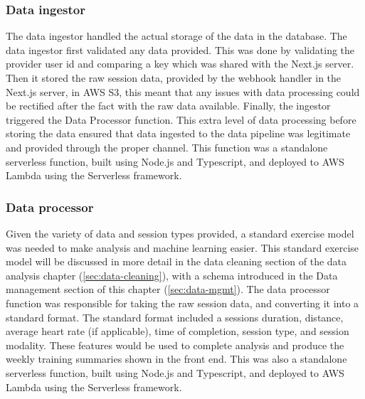 \subsubsection{Data ingestor}
The data ingestor handled the actual storage of the data in the database. The data ingestor first validated any data provided. This was done by validating the provider user id and comparing a key which was shared with the Next.js server. Then it stored the raw session data, provided by the webhook handler in the Next.js server, in AWS S3, this meant that any issues with data processing could be rectified after the fact with the raw data available. Finally, the ingestor triggered the Data Processor function. This extra level of data processing before storing the data ensured that data ingested to the data pipeline was legitimate and provided through the proper channel. This function was a standalone serverless function, built using Node.js and Typescript, and deployed to AWS Lambda using the Serverless framework.

\subsubsection{Data processor}
Given the variety of data and session types provided, a standard exercise model was needed to make analysis and machine learning easier. This standard exercise model will be discussed in more detail in the data cleaning section of the data analysis chapter (\ref{sec:data-cleaning}), with a schema introduced in the Data management section of this chapter (\ref{sec:data-mgmt}). The data processor function was responsible for taking the raw session data, and converting it into a standard format. The standard format included a sessions duration, distance, average heart rate (if applicable), time of completion, session type, and session modality. These features would be used to complete analysis and produce the weekly training summaries shown in the front end. This was also a standalone serverless function, built using Node.js and Typescript, and deployed to AWS Lambda using the Serverless framework.

